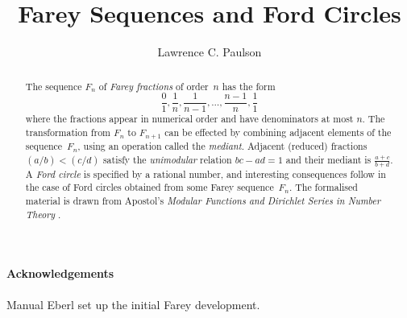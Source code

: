 \documentclass[11pt,a4paper]{article}
\begin{document}
\title{Farey Sequences and Ford Circles}
\author{Lawrence C. Paulson}
\maketitle

\begin{abstract}

The sequence $F_n$ of \emph{Farey fractions} of order~$n$ 
has the form 
$$\frac{0}{1}, \frac{1}{n}, \frac{1}{n-1}, \ldots, \frac{n-1}{n}, \frac{1}{1}$$
where the fractions appear in numerical order and have denominators at most $n$.
The transformation from $F_n$ to $F_{n+1}$ can be effected by combining adjacent elements of 
the sequence~$F_n$, using an operation called the \emph{mediant}.
Adjacent (reduced) fractions $(a/b) < (c/d)$ satisfy the \emph{unimodular}
relation $bc - ad = 1$ and their mediant is $\frac{a+c}{b+d}$.
A \emph{Ford circle} is specified by a rational number, and interesting consequences follow
in the case of Ford circles obtained from some Farey sequence~$F_n$.
The formalised material is drawn from Apostol's \emph{Modular Functions and Dirichlet Series in Number Theory}
\cite{apostol-modular-functions}.

\end{abstract}

\newpage



\paragraph*{Acknowledgements}
Manual Eberl set up the initial Farey development.



\end{document}
